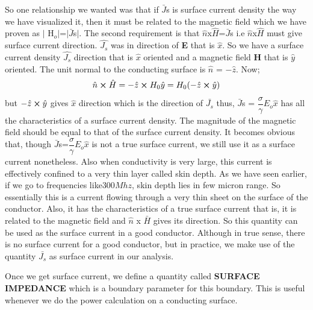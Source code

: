 So one relationship we wanted was that if $\bar{J}$s is surface current density the way we have visualized it, then it must be related to the magnetic field which we have proven as $\lvert$ H$_{o}$$\rvert$=$\rvert$$\bar{J}$s$\rvert$. The second requirement is that $\hat{n}$x$\hat{H}$=$\bar{J}$s i.e $\hat{n}$x$\hat{H}$  must give surface current direction. $\hat{J_{s}}$ was in direction of \textbf{E} that is $\hat{x}$. So  we have a surface current density $\hat{J_{s}}$ direction that is  $\hat{x}$ oriented and a magnetic field \textbf{H} that is $\hat{y}$ oriented. The unit normal to the conducting surface is $\hat{n}$ = $-\hat{z}$. Now;
\begin{equation*}
	\hat{n} \cross \hat{H} = -\hat{z} \cross H_{0}\hat{y} = H_{0}(-\hat{z} \cross \hat{y})
\end{equation*}
but $-\hat{z} \cross \hat{y}$ gives $\hat{x}$ direction which is the direction of $\bar{J_{s}}$
thus, $\bar{J}$s = $\dfrac{\sigma}{\gamma}$$E_{o}$$\hat{x}$ has all the characteristics of a surface current density. The magnitude of the magnetic field should be equal to that of the surface current density. It becomes obvious that, though $\bar{J}$s=$\dfrac{\sigma}{\gamma}$$E_{o}$$\hat{x}$ is not a true surface current, we still use it as a surface current nonetheless.
Also when conductivity is very large, this current is effectively confined to a very thin layer called skin depth. As we have seen earlier, if we go to frequencies like$ 300Mhz$, skin depth lies in few micron range. So essentially this is a current flowing through a very thin sheet on the surface of the conductor. Also, it has the characteristics of a true surface current that is, it is related to the magnetic field and $\hat{n}$ x $\bar{H}$ gives its direction. So this quantity can be used as the surface current in a good conductor. Although in true sense, there is no surface current for a good conductor, but in practice, we make use of the quantity $\bar{J_{s}}$ as surface current in our analysis.

Once we get surface current, we define a quantity called \textbf{SURFACE IMPEDANCE} which is a boundary parameter for this boundary. This is useful whenever we do the power calculation on a conducting surface.

